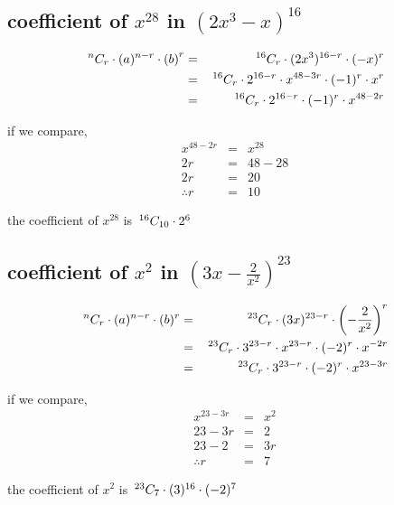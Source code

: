 \documentclass{article}
\begin{document}
\subsection{coefficient of $x^{28}$ in $(2x^3 - x)^{16}$}
\begin{eqnarray*}
    \,^{n} C _{r}\cdot(a)^{n-r}\cdot{(b)}^r &=& \,^{16} C _{r}\cdot(2x^3)^{16-r}\cdot(-x)^r\\
    &=& \,^{16} C _{r}\cdot 2^{16-r}\cdot x^{48-3r}\cdot (-1)^r \cdot x^r\\
    &=& \,^{16} C _{r}\cdot 2^{16-r} \cdot (-1)^{r} \cdot x^{48-2r}
\end{eqnarray*}

if we compare,
\begin{eqnarray*}
    x^{48-2r} &=& x^{28}\\
    2r &=& 48-28\\
    2r &=& 20\\
    \therefore r&=& 10
\end{eqnarray*}

the coefficient of $x^{28}$ is $\,^{16} C _{10}\cdot 2^{6}$

\subsection{coefficient of $x^2$ in $\left(3x-\frac{2}{x^2}\right)^{23}$}

\begin{eqnarray*}
    \,^{n} C _{r}\cdot (a)^{n-r} \cdot (b)^r &=& \,^{23} C _{r}\cdot (3x)^{23-r}\cdot \left(-\frac{2}{x^2}\right)^r\\
    &=& \,^{23} C _{r}\cdot 3^{23-r}\cdot x^{23-r}\cdot (-2)^r \cdot x^{-2r}\\
    &=& \,^{23} C _{r} \cdot 3^{23-r}\cdot (-2)^r\cdot x^{23-3r}
\end{eqnarray*}

if we compare,
\begin{eqnarray*}
    x^{23-3r} &=& x^2\\
    23-3r &=& 2\\
    23-2 &=& 3r\\
    \therefore r &=& 7
\end{eqnarray*}


the coefficient of $x^2$ is $\,^{23} C _{7}\cdot (3)^{16}\cdot (-2)^7$
\end{document}

